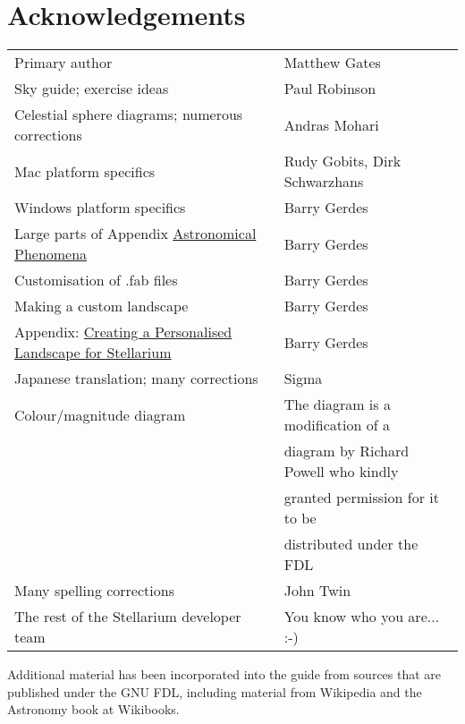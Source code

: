
\chapter{Acknowledgements}

\begin{longtable}[c]{@{}ll@{}}
\toprule
Primary author & Matthew Gates \tabularnewline
Sky guide; exercise ideas & Paul Robinson\tabularnewline
Celestial sphere diagrams; numerous corrections & Andras Mohari\tabularnewline
Mac platform specifics & Rudy Gobits, Dirk Schwarzhans\tabularnewline
Windows platform specifics & Barry Gerdes\tabularnewline
Large parts of Appendix \href{Astronomical_Phenomena}{Astronomical Phenomena}& Barry Gerdes\tabularnewline
Customisation of .fab files& Barry Gerdes\tabularnewline 
Making a custom landscape & Barry Gerdes\tabularnewline
Appendix: \href{Creating_a_Personalised_Landscape_for_Stellarium}{Creating a Personalised Landscape for Stellarium} & Barry Gerdes\tabularnewline
Japanese translation; many corrections & Sigma\tabularnewline
Colour/magnitude diagram & The diagram is a modification of a \\
                          & diagram by Richard Powell who kindly \\
                          & granted permission for it to be \\
                          & distributed under the FDL\tabularnewline
Many spelling corrections & John Twin\tabularnewline
The rest of the Stellarium developer team & You know who you are... :-)\tabularnewline
\bottomrule
\end{longtable}

Additional material has been incorporated into the guide from sources
that are published under the GNU FDL, including material from Wikipedia
and the Astronomy book at Wikibooks.
